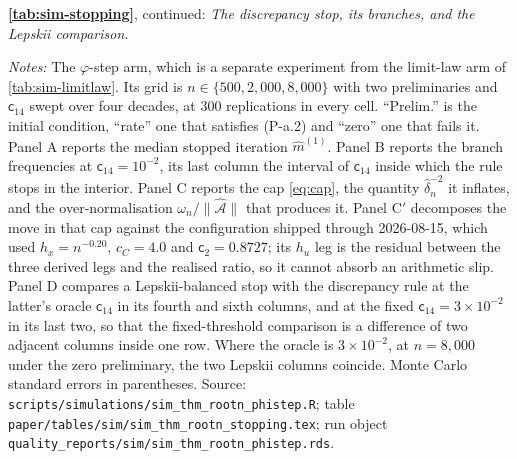 \documentclass[
  12pt]{article}
\newcommand{\1}[1]{\mathds{1}\left[#1\right]}
\theoremstyle{plain}
\theoremstyle{definition}
\theoremstyle{definition}
\theoremstyle{remark}
\begin{document}
\begin{landscape}
%
\begingroup\singlespacing\scriptsize
\noindent\textbf{\cref{tab:sim-stopping}}, continued: \emph{The discrepancy
stop, its branches, and the Lepskii comparison.}\par\smallskip
\noindent\textit{Notes:} The $\varphi$-step arm, which is a separate experiment from
the limit-law arm of \cref{tab:sim-limitlaw}. Its grid is
$n\in\{500,2{,}000,8{,}000\}$ with two preliminaries and $\mathsf c_{14}$ swept
over four decades, at $300$ replications in every cell. ``Prelim.'' is the
initial condition, ``rate'' one that satisfies (P-a.2) and ``zero'' one that
fails it. Panel A reports the median stopped iteration $\hat m^{(1)}$. Panel B
reports the branch frequencies at $\mathsf c_{14}=10^{-2}$, its last column the
interval of $\mathsf c_{14}$ inside which the rule stops in the interior. Panel
C reports the cap \eqref{eq:cap}, the quantity $\hat\delta_n^{-2}$ it inflates,
and the over-normalisation $\omega_n/\|\hat{\mathcal A}\|$ that produces it.
Panel C$'$ decomposes the move in that cap against the configuration shipped
through 2026-08-15, which used $h_x=n^{-0.20}$, $c_C=4.0$ and
$\mathsf c_2=0.8727$; its $h_u$ leg is the residual between the three derived
legs and the realised ratio, so it cannot absorb an arithmetic slip. Panel D
compares a Lepskii-balanced stop with the discrepancy rule at the latter's
oracle $\mathsf c_{14}$ in its fourth and sixth columns, and at the fixed
$\mathsf c_{14}=3\times10^{-2}$ in its last two, so that the fixed-threshold
comparison is a difference of two adjacent columns inside one row. Where the
oracle is $3\times10^{-2}$, at $n=8{,}000$ under the zero preliminary, the two
Lepskii columns coincide. Monte Carlo
standard errors in parentheses. Source:
\texttt{scripts/simulations/sim\_thm\_rootn\_phistep.R}; table
\texttt{paper/tables/sim/sim\_thm\_rootn\_stopping.tex}; run object
\texttt{quality\_reports/sim/sim\_thm\_rootn\_phistep.rds}.
\par\endgroup
\end{landscape}
\end{document}
